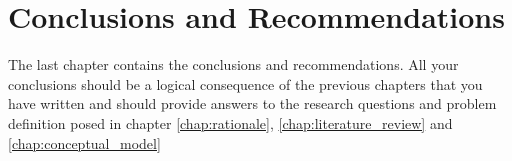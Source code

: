 \chapter{Conclusions and Recommendations}\label{cap:conclusions_recommendations}

The last chapter contains the conclusions and recommendations. All your conclusions should be a logical consequence of the previous chapters that you have written and should provide answers to the research questions and problem definition posed in chapter \ref{chap:rationale}, \ref{chap:literature_review} and \ref{chap:conceptual_model} 


